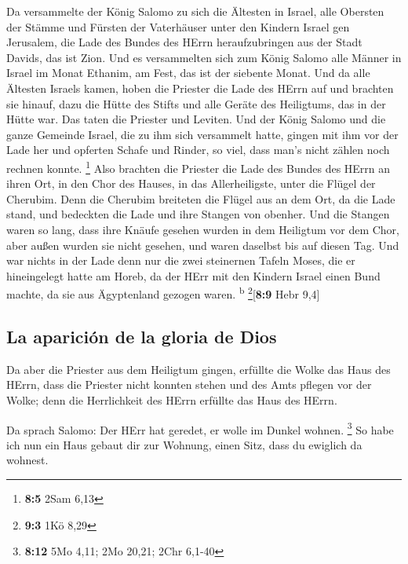  Da versammelte der König Salomo zu sich die Ältesten in
Israel, alle Obersten der Stämme und Fürsten der Vaterhäuser unter den
Kindern Israel gen Jerusalem, die Lade des Bundes des HErrn
heraufzubringen aus der Stadt Davids, das ist Zion.  Und
es versammelten sich zum König Salomo alle Männer in Israel im Monat
Ethanim, am Fest, das ist der siebente Monat.  Und da alle
Ältesten Israels kamen, hoben die Priester die Lade des HErrn auf
 und brachten sie hinauf, dazu die Hütte des Stifts und
alle Geräte des Heiligtums, das in der Hütte war. Das taten die Priester
und Leviten.  Und der König Salomo und die ganze Gemeinde
Israel, die zu ihm sich versammelt hatte, gingen mit ihm vor der Lade
her und opferten Schafe und Rinder, so viel, dass man's nicht zählen
noch rechnen konnte. \footnote{\textbf{8:5} 2Sam 6,13} 
Also brachten die Priester die Lade des Bundes des HErrn an ihren Ort,
in den Chor des Hauses, in das Allerheiligste, unter die Flügel der
Cherubim.  Denn die Cherubim breiteten die Flügel aus an
dem Ort, da die Lade stand, und bedeckten die Lade und ihre Stangen von
obenher.  Und die Stangen waren so lang, dass ihre Knäufe
gesehen wurden in dem Heiligtum vor dem Chor, aber außen wurden sie
nicht gesehen, und waren daselbst bis auf diesen Tag.  Und
war nichts in der Lade denn nur die zwei steinernen Tafeln Moses, die er
hineingelegt hatte am Horeb, da der HErr mit den Kindern Israel einen
Bund machte, da sie aus Ägyptenland gezogen waren. \textsuperscript{b}
\footnote{\textbf{9:3} 1Kö 8,29}{[}\textbf{8:9} Hebr 9,4{]}

\hypertarget{la-apariciuxf3n-de-la-gloria-de-dios}{%
\subsection{La aparición de la gloria de
Dios}\label{la-apariciuxf3n-de-la-gloria-de-dios}}

 Da aber die Priester aus dem Heiligtum gingen, erfüllte
die Wolke das Haus des HErrn,  dass die Priester nicht
konnten stehen und des Amts pflegen vor der Wolke; denn die Herrlichkeit
des HErrn erfüllte das Haus des HErrn.

 Da sprach Salomo: Der HErr hat geredet, er wolle im
Dunkel wohnen. \footnote{\textbf{8:12} 5Mo 4,11; 2Mo 20,21; 2Chr 6,1-40}
 So habe ich nun ein Haus gebaut dir zur Wohnung, einen
Sitz, dass du ewiglich da wohnest.

